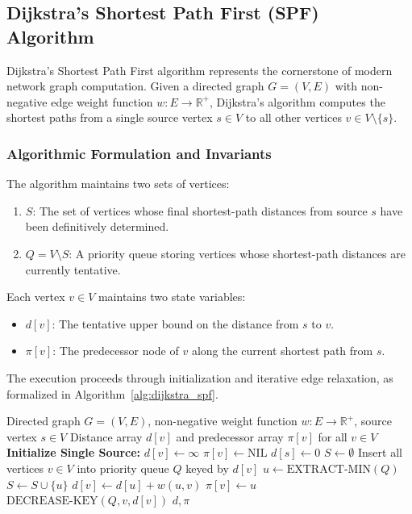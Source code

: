 \documentclass[12pt,a4paper,oneside]{report}
\begin{document}
\subsection{Dijkstra's Shortest Path First (SPF) Algorithm}
Dijkstra's Shortest Path First algorithm \cite{dijkstra1959note} represents the cornerstone of modern network graph computation. Given a directed graph $G = (V, E)$ with non-negative edge weight function $w: E \to \mathbb{R}^+$, Dijkstra's algorithm computes the shortest paths from a single source vertex $s \in V$ to all other vertices $v \in V \setminus \{s\}$.

\subsubsection{Algorithmic Formulation and Invariants}
The algorithm maintains two sets of vertices:
\begin{enumerate}
    \item $S$: The set of vertices whose final shortest-path distances from source $s$ have been definitively determined.
    \item $Q = V \setminus S$: A priority queue storing vertices whose shortest-path distances are currently tentative.
\end{enumerate}

Each vertex $v \in V$ maintains two state variables:
\begin{itemize}
    \item $d[v]$: The tentative upper bound on the distance from $s$ to $v$.
    \item $\pi[v]$: The predecessor node of $v$ along the current shortest path from $s$.
\end{itemize}

The execution proceeds through initialization and iterative edge relaxation, as formalized in Algorithm~\ref{alg:dijkstra_spf}.

\begin{algorithm}[htbp]
\caption{Dijkstra's Shortest Path First (SPF) Algorithm}
\label{alg:dijkstra_spf}
\begin{algorithmic}[1]
\REQUIRE Directed graph $G = (V, E)$, non-negative weight function $w: E \to \mathbb{R}^+$, source vertex $s \in V$
\ENSURE Distance array $d[v]$ and predecessor array $\pi[v]$ for all $v \in V$
\STATE \textbf{Initialize Single Source:}
    \STATE $d[v] \gets \infty$
    \STATE $\pi[v] \gets \text{NIL}$
\ENDFOR
\STATE $d[s] \gets 0$
\STATE $S \gets \emptyset$
\STATE Insert all vertices $v \in V$ into priority queue $Q$ keyed by $d[v]$
    \STATE $u \gets \text{EXTRACT-MIN}(Q)$
    \STATE $S \gets S \cup \{u\}$
            \STATE {}
            \STATE $d[v] \gets d[u] + w(u, v)$
            \STATE $\pi[v] \gets u$
            \STATE $\text{DECREASE-KEY}(Q, v, d[v])$
        \ENDIF
    \ENDFOR
\ENDWHILE
\RETURN $d, \pi$
\end{algorithmic}
\end{algorithm}
\end{document}
